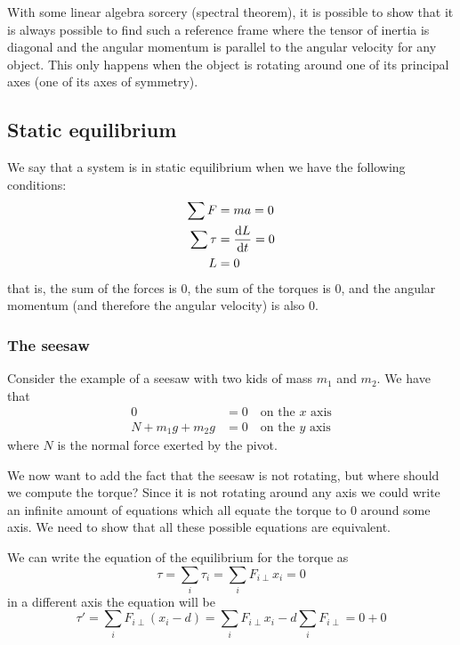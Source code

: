 \documentclass[14pt]{extarticle}
\begin{document}
With some linear algebra sorcery (spectral theorem), it is possible to show that it is always possible to find such a reference frame where the tensor of inertia is diagonal and the angular momentum is parallel to the angular velocity for any object.
This only happens when the object is rotating around one of its principal axes (one of its axes of symmetry).


\subsection{Static equilibrium}

We say that a system is in static equilibrium when we have the following conditions:
\begin{align}
    \sum F    & = ma = 0        \\
    \sum \tau & = \dv{L}{t} = 0 \\
    L         & = 0
\end{align}
that is, the sum of the forces is $0$, the sum of the torques is $0$, and the angular momentum (and therefore the angular velocity) is also $0$.

\subsubsection{The seesaw}

Consider the example of a seesaw with two kids of mass $m_1$ and $m_2$.
We have that
\begin{align}
    0                 & = 0 \quad \text{on the $x$ axis} \\
    N + m_1 g + m_2 g & = 0 \quad \text{on the $y$ axis}
\end{align}
where $N$ is the normal force exerted by the pivot.

We now want to add the fact that the seesaw is not rotating, but where should we compute the torque?
Since it is not rotating around any axis we could write an infinite amount of equations which all equate the torque to $0$ around some axis.
We need to show that all these possible equations are equivalent.

We can write the equation of the equilibrium for the torque as
\begin{equation}
    \tau = \sum_i \tau_i = \sum_i F_{i \perp} x_i = 0
\end{equation}
in a different axis the equation will be
\begin{equation}
    \tau' = \sum_i F_{i \perp} (x_i - d) = \sum_i F_{i \perp} x_i - d \sum_i F_{i \perp} = 0 + 0
\end{equation}
\end{document}
